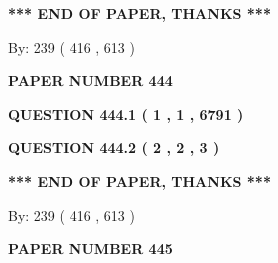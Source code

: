 \documentclass[12pt]{article}
\begin{document}
   
   
   
   
\vspace{1.0in} 
{\textbf{\large{ *** END OF PAPER, THANKS *** }}} 
   
   
\hspace{1.0in} By: 
 239 ( 416 ,  613 )
   
   
   
   
\newpage 
\setcounter{page}{ 
   444001 } 
   
   
   
   
 {\textbf{ \Large{ PAPER NUMBER  444  }}}
   
   
\vspace{0.2in}
   
   
   
   
   
   
 \vspace{0.2in}
 
 
 
 
   
   
  
\vspace{0.2in}
  
{\textbf{\Large{QUESTION
444.1 
 ( 1 , 1 , 6791 )
}}}
  
  
  
\vspace{0.2in}
  
{\textbf{\Large{QUESTION
444.2 
 ( 2 , 2 , 3 )
}}}
  
  
   
   
 \vspace{0.2in}
 
   
   
   
   
\vspace{1.0in} 
{\textbf{\large{ *** END OF PAPER, THANKS *** }}} 
   
   
\hspace{1.0in} By: 
 239 ( 416 ,  613 )
   
   
   
   
\newpage 
\setcounter{page}{ 
   445001 } 
   
   
   
   
 {\textbf{ \Large{ PAPER NUMBER  445  }}}
   
   
\vspace{0.2in}
   
\end{document}
